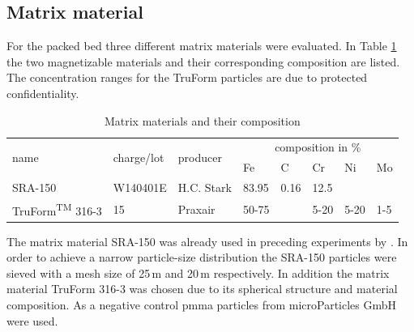 \subsection{Matrix material}
\label{subsec:Matrix_mat}
For the packed bed three different matrix materials were evaluated. In Table \ref{table:mat_material} the two magnetizable materials and their corresponding composition are listed. The concentration ranges for the TruForm particles are due to protected confidentiality. %

\begin{table}[H]
\centering
\caption{Matrix materials and their composition}
\label{table:mat_material}
\begin{tabular}{llllllll}\hline
\multirow{2}{*}{name} & \multirow{2}{*}{charge/lot} & \multirow{2}{*}{producer} & \multicolumn{5}{c}{composition in \%}  \\
& & & Fe & C & Cr & Ni & Mo \\
\hline\hline
SRA-150 & W140401E & H.C. Stark & 83.95 & 0.16 & 12.5  & & \\
TruForm\textsuperscript{TM} 316-3 & 15 & Praxair & 50-75 & & 5-20 &5-20& 1-5\\
\hline
\end{tabular}
\end{table}

The matrix material SRA-150 was already used in preceding experiments by \cite{AndreMaster}. In order to achieve a narrow particle-size distribution the SRA-150 particles were sieved with a mesh size of 25\,\textmu m and 20\,\textmu m respectively. In addition the matrix material TruForm 316-3 was chosen due to its spherical structure and material composition. 
As a negative control \gls{pmma} particles from microParticles GmbH were used. 

